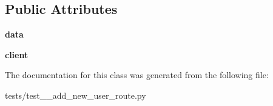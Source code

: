 \subsection*{Public Attributes}
\begin{DoxyCompactItemize}
\item 
\mbox{\label{classtests_1_1test__1__add__new__user__route_1_1_test_user_routes_ae252557390d4acfdc978bff4b26ffeaa}} 
{\bfseries data}
\item 
\mbox{\label{classtests_1_1test__1__add__new__user__route_1_1_test_user_routes_a3a446edfe4af7dbc375d2ae69ae8bcac}} 
{\bfseries client}
\end{DoxyCompactItemize}


The documentation for this class was generated from the following file\+:\begin{DoxyCompactItemize}
\item 
tests/test\+\_\+\_\+add\+\_\+new\+\_\+user\+\_\+route.\+py\end{DoxyCompactItemize}
